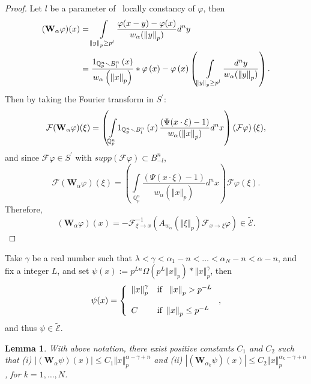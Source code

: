 \documentclass{amsart}\usepackage{amsfonts}
\theoremstyle{plain}
\newtheorem{lemma}[theorem]{Lemma}
\numberwithin{equation}{section}
\begin{document}
\begin{proof}
Let $l$ be a parameter of \ locally constancy of $\varphi$, then
\begin{align*}
(\mathbf{W}_{\alpha}\varphi)(x)  &  ={\displaystyle\int\limits_{\left\Vert y\right\Vert _{p}\geq p^{l}}}
\frac{\varphi(x-y)-\varphi(x)}{w_{\alpha}(\left\Vert y\right\Vert _{p})}d^{n}y\\
&  =\frac{{\LARGE 1}_{\mathbb{Q}_{p}^{n}\smallsetminus B_{l}^{n}}\left(
x\right)  }{w_{\alpha}\left(  \left\Vert x\right\Vert _{p}\right)  }\ast\varphi\left(  x\right)  -\varphi\left(  x\right)  \left(  {\int
\limits_{\left\Vert y\right\Vert _{p}\geq p^{l}}}\frac{d^{n}y}{w_{\alpha
}(\left\Vert y\right\Vert _{p})}\right)  .
\end{align*}
Then by taking the Fourier transform in $S^{\prime}$:
\[
\mathcal{F}(\mathbf{W}_{\alpha}\varphi)(\xi)=\left(
{\displaystyle\int\limits_{\mathbb{Q}_{p}^{n}}}
{\LARGE 1}_{\mathbb{Q}_{p}^{n}\smallsetminus B_{l}^{n}}\left(  x\right)
\frac{(\Psi(x\cdot\xi)-1)}{w_{\alpha}(\left\Vert x\right\Vert _{p})}d^{n}x\right)  \left(  \mathcal{F}\varphi\right)  (\xi),
\]
and since $\mathcal{F}\varphi\in S^{\prime}$ with $supp(\mathcal{F}\varphi)\subset B_{-l}^{n}$,\[
\mathcal{F}(\mathbf{W}_{\alpha}\varphi)(\xi)=\left(
{\displaystyle\int\limits_{\mathbb{Q}_{p}^{n}}}
\frac{(\Psi(x\cdot\xi)-1)}{w_{\alpha}(\left\Vert x\right\Vert _{p})}d^{n}x\right)  \mathcal{F}\varphi(\xi).
\]
Therefore,\[
(\mathbf{W}_{\alpha}\varphi)(x)=-\mathcal{F}_{\xi\rightarrow x}^{-1}\left(
A_{w_{\alpha}}(\left\Vert \xi\right\Vert _{p})\mathcal{F}_{x\rightarrow\xi
}\varphi\right)  \in\widetilde{\mathcal{E}}.
\]

\end{proof}

Take $\gamma$ be a real number such that $\lambda<\gamma<\alpha_{1}-n<\ldots<\alpha_{N}-n<\alpha-n$, and fix a integer $L$, and set
$\psi(x):=p^{Ln}\Omega(p^{L}\left\Vert x\right\Vert _{p})\ast\left\Vert
x\right\Vert _{p}^{\gamma}$, then\[
\psi(x)=\left\{
\begin{array}
[c]{ll}\left\Vert x\right\Vert _{p}^{\gamma} & \text{if \ }\left\Vert x\right\Vert
_{p}>p^{-L}\\
& \\
C & \text{if }\left\Vert x\right\Vert _{p}\leq p^{-L}\end{array}
\right.  ,
\]
and thus $\psi\in\widetilde{\mathcal{E}}$.

\begin{lemma}
\label{W(phi)<}With above notation, there exist positive constants $C_{1}$ and
$C_{2}$ such that (i) $\left\vert (\mathbf{W}_{\alpha}\psi)(x)\right\vert \leq
C_{1}\left\Vert x\right\Vert _{p}^{\alpha-\gamma+n}$ and (ii) $\left\vert
(\mathbf{W}_{\alpha_{k}}\psi)(x)\right\vert \leq C_{2}\left\Vert x\right\Vert
_{p}^{\alpha_{k}-\gamma+n}$, for $k=1,\ldots,N$.
\end{lemma}
\end{document}
